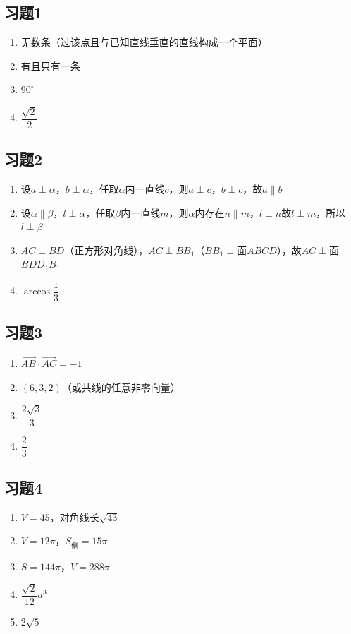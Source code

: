 \documentclass[a4paper,12pt]{ctexart}
\begin{document}
\newpage
{}

\subsection*{习题1}
\begin{enumerate}
  \item 无数条（过该点且与已知直线垂直的直线构成一个平面）
  \item 有且只有一条
  \item $90^\circ$
  \item $\dfrac{\sqrt2}{2}$
\end{enumerate}

\subsection*{习题2}
\begin{enumerate}
  \item 设$a\perp\alpha$，$b\perp\alpha$，任取$\alpha$内一直线$c$，则$a\perp c$，$b\perp c$，故$a\parallel b$
  \item 设$\alpha\parallel\beta$，$l\perp\alpha$，任取$\beta$内一直线$m$，则$\alpha$内存在$n\parallel m$，$l\perp n$故$l\perp m$，所以$l\perp\beta$
  \item $AC\perp BD$（正方形对角线），$AC\perp BB_1$（$BB_1\perp$面$ABCD$），故$AC\perp$面$BDD_1B_1$
  \item $\arccos\dfrac13$
\end{enumerate}

\subsection*{习题3}
\begin{enumerate}
  \item $\overrightarrow{AB}\cdot\overrightarrow{AC}=-1$
  \item $(6,3,2)$（或共线的任意非零向量）
  \item $\dfrac{2\sqrt3}{3}$
  \item $\dfrac23$
\end{enumerate}

\subsection*{习题4}
\begin{enumerate}
  \item $V=45$，对角线长$\sqrt{43}$
  \item $V=12\pi$，$S_{\text{侧}}=15\pi$
  \item $S=144\pi$，$V=288\pi$
  \item $\dfrac{\sqrt2}{12}a^3$
  \item $2\sqrt5$
\end{enumerate}
\end{document}
